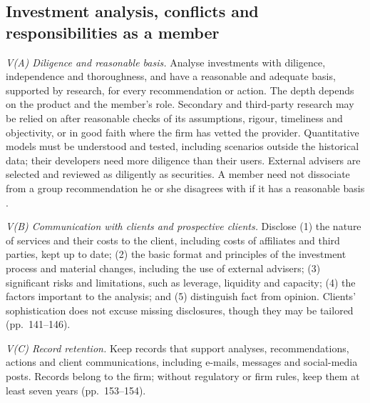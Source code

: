 \subsection{Investment analysis, conflicts and responsibilities as a member}

\begin{qfrule}\label{rule:standard-investment-analysis}
 \emph{V(A) Diligence and reasonable basis.} Analyse investments with diligence, independence and thoroughness, and have a reasonable and adequate basis, supported by research, for every recommendation or action. The depth depends on the product and the member's role. Secondary and third-party research may be relied on after reasonable checks of its assumptions, rigour, timeliness and objectivity, or in good faith where the firm has vetted the provider. Quantitative models must be understood and tested, including scenarios outside the historical data; their developers need more diligence than their users. External advisers are selected and reviewed as diligently as securities. A member need not dissociate from a group recommendation he or she disagrees with if it has a reasonable basis \citep[pp.~129--134]{standards-practice-handbook-2024}.

\emph{V(B) Communication with clients and prospective clients.} Disclose (1) the nature of services and their costs to the client, including costs of affiliates and third parties, kept up to date; (2) the basic format and principles of the investment process and material changes, including the use of external advisers; (3) significant risks and limitations, such as leverage, liquidity and capacity; (4) the factors important to the analysis; and (5) distinguish fact from opinion. Clients' sophistication does not excuse missing disclosures, though they may be tailored (pp.~141--146).

\emph{V(C) Record retention.} Keep records that support analyses, recommendations, actions and client communications, including e-mails, messages and social-media posts. Records belong to the firm; without regulatory or firm rules, keep them at least seven years (pp.~153--154).


\end{qfrule}
